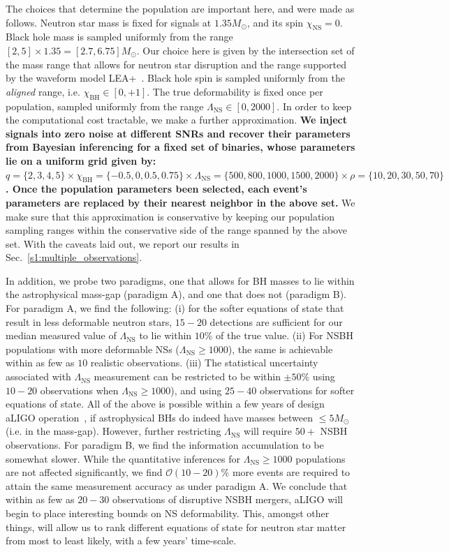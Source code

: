 \documentclass[aps,prd,amsmath,floats,floatfix, twocolumn,
superscriptaddress,nofootinbib,showpacs]{revtex4-1}
\newcommand{\prayush}{\textcolor{red!40!black}}
\newcommand{\lambdans}{\Lambda_\mathrm{NS}}
\newcommand{\chibh}{\chi_\mathrm{BH}}
\newcommand{\chins}{\chi_\mathrm{NS}}
\begin{document}
\prayush{
The choices that determine the population are important here,
and were made as follows. Neutron star mass is fixed for signals at
$1.35M_\odot$, and its spin $\chins=0$. Black hole mass is sampled uniformly
from the range $[2,5]\times 1.35=[2.7, 6.75]M_\odot$. Our choice here is given
by the intersection set of the mass range that allows for neutron star disruption
and the range supported by the waveform model LEA+~\cite{Foucart2012,
Foucart:2013a,Lackey:2013axa}. Black hole spin is sampled uniformly from the
{\it aligned} range, i.e. $\chibh\in[0,+1]$. The true deformability is fixed
once per population, sampled uniformly from the range $\lambdans\in[0,2000]$.
In order to keep the computational cost tractable, we make a further 
approximation.
%
\textbf{%
We inject signals into zero noise at different SNRs and recover
their parameters from Bayesian inferencing for a fixed set of binaries,
whose parameters lie on a uniform grid given by:
$q=\{2,3,4,5\}\times\chibh=\{-0.5,0,0.5,0.75\}\times\lambdans=\{500,800,1000,1500,2000\}\times\rho=\{10,20,30,50,70\}$.
% 
Once the population parameters been selected, each event's parameters are
replaced by their nearest neighbor in the above set.
}
We make sure that this approximation is conservative by keeping our population
sampling ranges within the conservative side of the range spanned by the above
set. With the caveats laid out, we report our results in
Sec.~\ref{s1:multiple_observations}.
}


\prayush{
In addition, we probe two paradigms, one
that allows for BH masses to lie within the astrophysical mass-gap (paradigm
A), and one that does not (paradigm B).
% 
For paradigm A, we find the following: (i) for the softer equations of state
that result in less deformable neutron stars, $15-20$ detections are sufficient
for our median measured value of $\lambdans$ to lie within $10\%$ of the true
value. (ii) For NSBH populations with more deformable NSs
($\lambdans\geq 1000$), the same is achievable within as few as $10$ realistic
observations. (iii) The statistical uncertainty associated with $\lambdans$
measurement can be restricted to be within $\pm50\%$ using $10-20$ observations
when $\lambdans\geq 1000$), and using $25-40$ observations for softer equations
of state. All of the above is possible within a few years of design
aLIGO operation~\cite{Abadie:2010cfa}, if astrophysical BHs do indeed have
masses between $\leq 5M_\odot$ (i.e. in the mass-gap). However, further
restricting $\lambdans$ will require $50+$ NSBH observations.
% 
For paradigm B, we find the information accumulation to be somewhat slower.
While the quantitative inferences for $\lambdans\geq1000$ populations are
not affected significantly, we find $\mathcal{O}(10-20)\%$ more events are
required to attain the same measurement accuracy as under paradigm A.
% 
We conclude that within as few as $20-30$ observations of disruptive NSBH
mergers, aLIGO will begin to place interesting bounds on NS deformability.
This, amongst other things, will allow us to rank different equations of 
state for neutron star matter from most to least likely, with a few years'
time-scale.
}
\end{document}
